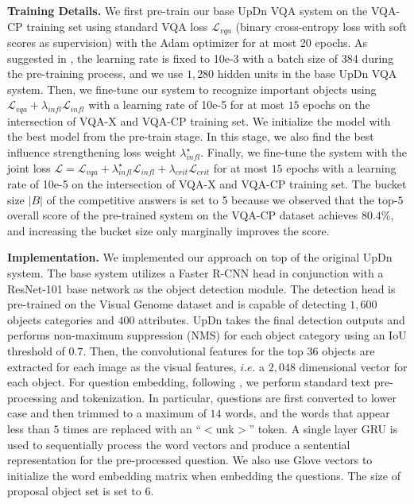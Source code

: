 \documentclass{article}
\begin{document}
\noindent\textbf{Training Details.} We first pre-train our base UpDn VQA system on the VQA-CP training set using standard VQA loss $\mathcal{L}_{vqa}$ (binary cross-entropy loss with soft scores as supervision) with the Adam optimizer \cite{kingma2014adam} for at most 20 epochs. As suggested in \cite{teney2017tips}, the learning rate is fixed to 10e-3 with a batch size of 384 during the pre-training process, and we use $1,280$ hidden units in the base UpDn VQA system. 
Then, we fine-tune our system to recognize important objects using $\mathcal{L}_{vqa} + \lambda_{infl}\mathcal{L}_{infl}$ with a learning rate of 10e-5 for at most $15$ epochs on the intersection of VQA-X and VQA-CP training set. We initialize the model with the best model from the pre-train stage. In this stage, we also find the best influence strengthening loss weight $\lambda_{infl}^\star$.
Finally, we fine-tune the system with the joint loss $\mathcal{L} = \mathcal{L}_{vqa} + \lambda_{infl}^\star\mathcal{L}_{infl} + \lambda_{crit} \mathcal{L}_{crit}$ for at most $15$ epochs with a learning rate of 10e-5 on the intersection of VQA-X and VQA-CP training set. The bucket size $|B|$ of the competitive answers is set to 5 because we observed that the top-$5$ overall score of the pre-trained system on the VQA-CP dataset achieves 80.4\%, and increasing the bucket size only marginally improves the score.

\noindent\textbf{Implementation.}
We implemented our approach on top of the original UpDn system. The base system utilizes a Faster R-CNN head \cite{girshick2015fast} in conjunction with a ResNet-101 base network \cite{he2016deep} as the object detection module. The detection head is pre-trained on the Visual Genome dataset \cite{krishna2017visual} and is capable of detecting $1,600$ objects categories and $400$ attributes. UpDn takes the final detection outputs and performs non-maximum suppression (NMS) for each object category using an IoU threshold of $0.7$. Then, the convolutional features for the top $36$ objects are extracted for each image as the visual features, $i.e.$ a $2,048$ dimensional vector for each object. For question embedding, following \cite{anderson2017bottom}, we perform standard text pre-processing and tokenization. In particular, questions are first converted to lower case and then trimmed to a maximum of $14$ words, and the words that appear less than $5$ times are replaced with an ``$<$unk$>$'' token. A single layer GRU \cite{cho2014learning} is used to sequentially process the word vectors and produce a sentential representation for the pre-processed question. We also use Glove vectors \cite{pennington2014glove} to initialize the word embedding matrix when embedding the questions. The size of proposal object set is set to 6.
\end{document}
